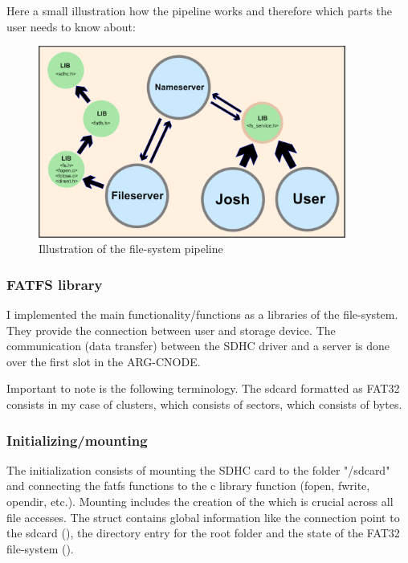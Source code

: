 Here a small illustration how the pipeline works and therefore which parts the user needs to know about:

\begin{figure}[h]
    \centering
    \includegraphics[width=0.9\textwidth]{./filesystem/data/fileaccess.png}
    \caption{Illustration of the file-system pipeline}
    \label{fig:ns_rtt}
\end{figure}

\subsubsection{FATFS library}
I implemented the main functionality/functions as a libraries of the file-system. They provide the connection between user and storage device. The communication (data transfer) between the SDHC driver and a server is done over the first slot in the ARG-CNODE. 

Important to note is the following terminology. The sdcard formatted as FAT32 consists in my case of clusters, which consists of sectors, which consists of bytes.

\subsubsection{Initializing/mounting}
The initialization consists of mounting the SDHC card to the folder "/sdcard" and connecting the fatfs functions to the c library function (fopen, fwrite, opendir, etc.). Mounting includes the creation of the  which is crucial across all file accesses. 
The struct contains global information like the connection point to the sdcard (), the directory entry for the root folder and the state of the FAT32 file-system (). 

